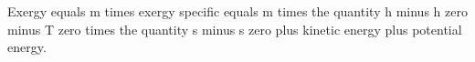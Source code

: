 Exergy equals m times exergy specific equals m times the quantity h minus h zero minus T zero times the quantity s minus s zero plus kinetic energy plus potential energy.